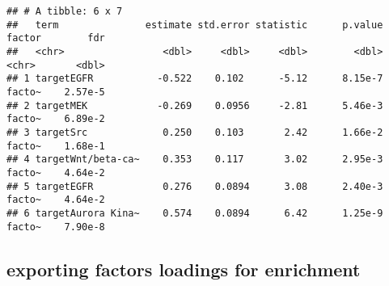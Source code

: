 \documentclass[
]{article}
\newenvironment{Shaded}{\begin{snugshade}}{\end{snugshade}}
\newcommand{\DataTypeTok}[1]{\textcolor[rgb]{0.13,0.29,0.53}{#1}}
\newcommand{\FloatTok}[1]{\textcolor[rgb]{0.00,0.00,0.81}{#1}}
\newcommand{\KeywordTok}[1]{\textcolor[rgb]{0.13,0.29,0.53}{\textbf{#1}}}
\newcommand{\NormalTok}[1]{#1}
\newcommand{\OperatorTok}[1]{\textcolor[rgb]{0.81,0.36,0.00}{\textbf{#1}}}
\newcommand{\StringTok}[1]{\textcolor[rgb]{0.31,0.60,0.02}{#1}}
\begin{document}
\begin{Shaded}
\end{Shaded}

\begin{verbatim}
## # A tibble: 6 x 7
##   term               estimate std.error statistic      p.value factor        fdr
##   <chr>                 <dbl>     <dbl>     <dbl>        <dbl> <chr>       <dbl>
## 1 targetEGFR           -0.522    0.102      -5.12      8.15e-7 facto~    2.57e-5
## 2 targetMEK            -0.269    0.0956     -2.81      5.46e-3 facto~    6.89e-2
## 3 targetSrc             0.250    0.103       2.42      1.66e-2 facto~    1.68e-1
## 4 targetWnt/beta-ca~    0.353    0.117       3.02      2.95e-3 facto~    4.64e-2
## 5 targetEGFR            0.276    0.0894      3.08      2.40e-3 facto~    4.64e-2
## 6 targetAurora Kina~    0.574    0.0894      6.42      1.25e-9 facto~    7.90e-8
\end{verbatim}

\hypertarget{exporting-factors-loadings-for-enrichment}{%
\subsection{exporting factors loadings for
enrichment}\label{exporting-factors-loadings-for-enrichment}}
\end{document}

